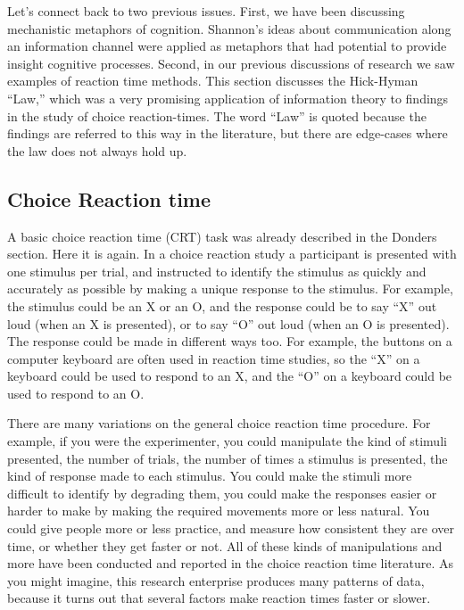 \documentclass[
  oneside,
  12pt]{crumpbook}
\begin{document}
Let's connect back to two previous issues. First, we have been discussing mechanistic metaphors of cognition. Shannon's ideas about communication along an information channel were applied as metaphors that had potential to provide insight cognitive processes. Second, in our previous discussions of research we saw examples of reaction time methods. This section discusses the Hick-Hyman ``Law,'' which was a very promising application of information theory to findings in the study of choice reaction-times. The word ``Law'' is quoted because the findings are referred to this way in the literature, but there are edge-cases where the law does not always hold up.

\hypertarget{choice-reaction-time}{%
\subsection{Choice Reaction time}\label{choice-reaction-time}}

A basic choice reaction time (CRT) task was already described in the Donders section. Here it is again. In a choice reaction study a participant is presented with one stimulus per trial, and instructed to identify the stimulus as quickly and accurately as possible by making a unique response to the stimulus. For example, the stimulus could be an X or an O, and the response could be to say ``X'' out loud (when an X is presented), or to say ``O'' out loud (when an O is presented). The response could be made in different ways too. For example, the buttons on a computer keyboard are often used in reaction time studies, so the ``X'' on a keyboard could be used to respond to an X, and the ``O'' on a keyboard could be used to respond to an O.

There are many variations on the general choice reaction time procedure. For example, if you were the experimenter, you could manipulate the kind of stimuli presented, the number of trials, the number of times a stimulus is presented, the kind of response made to each stimulus. You could make the stimuli more difficult to identify by degrading them, you could make the responses easier or harder to make by making the required movements more or less natural. You could give people more or less practice, and measure how consistent they are over time, or whether they get faster or not. All of these kinds of manipulations and more have been conducted and reported in the choice reaction time literature. As you might imagine, this research enterprise produces many patterns of data, because it turns out that several factors make reaction times faster or slower.
\end{document}
